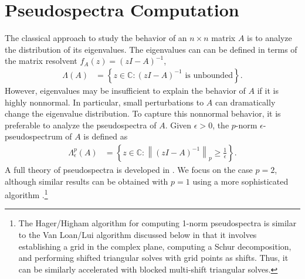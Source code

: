\documentclass{article}
\begin{document}
\section{Pseudospectra Computation}
The classical approach to study the behavior of an \(n\times n\)
matrix \(A\) is to analyze the distribution of its eigenvalues. The
eigenvalues can can be defined in terms of the matrix resolvent
\(f_A(z)=\left(z I- A\right)^{-1}\),
\begin{align}
  \Lambda(A) &= \left\lbrace z\in\mathbb{C} : \text{\(\left( zI
        -A\right)^{-1}\) is unbounded} \right\rbrace.
\end{align}
However, eigenvalues may be insufficient to explain the behavior of
\(A\)
if it is highly nonnormal.  In particular, small perturbations to
\(A\)
can dramatically change the eigenvalue distribution. To capture this
nonnormal behavior, it is preferable to analyze the pseudospectra of
\(A\).
Given \(\epsilon>0\),
the \(p\)-norm \(\epsilon\)-pseudospectrum of \(A\) is defined as
\begin{align}
  \Lambda_\epsilon^p(A) &= \left\lbrace z\in\mathbb{C} : \left\lVert
      \left(zI-A\right)^{-1}\right\rVert_p \geq \frac{1}{\epsilon}
  \right\rbrace.
\end{align}
A full theory of pseudospectra is developed in
\cite{trefethen2005spectra}. We focus on the case \(p=2\),
although similar results can be obtained with \(p=1\)
using a more sophisticated algorithm
\cite{higham2000block}.\footnote{The Hager/Higham algorithm for
  computing 1-norm pseudospectra is similar to the Van Loan/Lui
  algorithm discussed below in that it involves establishing a grid in
  the complex plane, computing a Schur decomposition, and performing
  shifted triangular solves with grid points as shifts. Thus, it can
  be similarly accelerated with blocked multi-shift triangular
  solves. }
\end{document}
